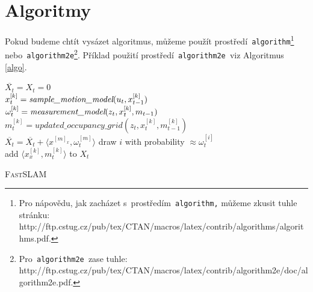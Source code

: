 \documentclass[11pt, a4paper]{article}
\begin{document}
\section{Algoritmy}
\label{sec:3}
    Pokud budeme chtít vysázet algoritmus, můžeme použít prostředí\texttt{ algorithm}\footnote{Pro nápovědu, jak zacházet
s~prostředím\texttt{ algorithm,} můžeme zkusit tuhle stránku:\\ http://ftp.cstug.cz/pub/tex/CTAN/macros/latex/contrib/algorithms/algorithms.pdf.} \quad\!\!nebo\texttt{ algorithm2e}\footnote{Pro\texttt{ algorithm2e }zase tuhle: http://ftp.cstug.cz/pub/tex/CTAN/macros/latex/contrib/algorithm2e/doc/algorithm2e.pdf.}. Příklad použití prostředí\texttt{ algorithm2e }viz Algoritmus \ref{algo}.
    \bigskip
    \IncMargin{1.5em} 
    \begin{algorithm}
    \Indm\Indmm
    \Indp\Indpp
        \BlankLine
    \SetNlSkip{0.3em}
        $\overline{X_t} = X_t = 0$ \\
        {
            $x^{[k]}_t = \emph{sample\_motion\_model}(u_t, x^{[k]}_{t-1})$ \\
            $\omega^{[k]}_t = \emph{measurement\_model}(z_t, x^{[k]}_t, m_{t-1})$ \\
            $m^{[k]}_t = updated\_occupancy\_grid(z_t, x^{[k]}_t, m^{[k]}_{t-1})$ \\
            $\overline{X_t} = \overline{X_t} + \langle x^{[m]_x}, \omega^{[m]}_t \rangle$
        }
        {
            draw $i$ with probability $\approx \omega^{[i]}_t$ \\
            add $\langle x^{[k]}_x, m^{[k]}_t \rangle$ to $X_t$ \\
        }
    \caption{\textsc{FastSLAM}}
    \label{algo}
    \end{algorithm}
    \vspace{-0.566em}
    
\end{document}

